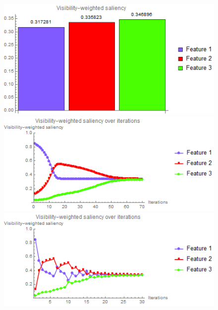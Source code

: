 \begin{figure}
\begin{minipage}{.24\textwidth}
		\subcaption{}
	\end{minipage}~
	\begin{minipage}{.24\textwidth}
		\includegraphics[width=1\linewidth]{images/vortex_naive_optimized_fixed_visibility_saliency_weighted_chart}
		\subcaption{}
	\end{minipage}	
	
	\begin{minipage}{.49\textwidth}
		\includegraphics[width=1\linewidth]{images/vortex_naive_saliency_fixed}
		\subcaption{}
	\end{minipage}
	\begin{minipage}{.49\textwidth}
		\includegraphics[width=1\linewidth]{images/vortex_naive_saliency_parallelsearch}
		\subcaption{}
	\end{minipage}
	

\end{figure}
